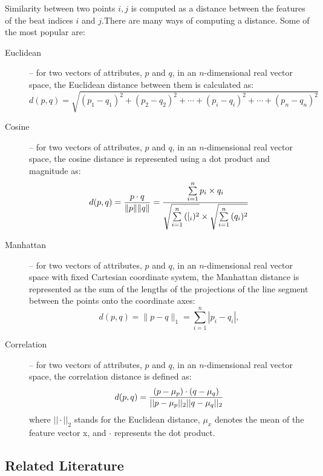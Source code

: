 Similarity between two points $i, j$ is computed as a distance between the features of the beat indices $i$ and $j$.There are many ways of computing a distance. Some of the most popular are:
\begin{description}
\item[Euclidean] --  for two vectors of attributes, $p$ and $q$, in an $n$-dimensional real vector space, the Euclidean distance between them is calculated as:
\begin{equation}
d(p, q) = \sqrt{(p_1- q_1)^2 + (p_2 - q_2)^2+\cdots+(p_i - q_i)^2+\cdots+(p_n - q_n)^2}
\end{equation}
\item[Cosine] --  for two vectors of attributes, $p$ and $q$, in an $n$-dimensional real vector space, the cosine distance is represented using a dot product and magnitude as:
\begin{equation}
d(p, q) = {p \cdot q \over \|p\| \|q\|} = \frac{ \sum\limits_{i=1}^{n}{p_i \times q_i} }{ \sqrt{\sum\limits_{i=1}^{n}{([_i)^2}} \times \sqrt{\sum\limits_{i=1}^{n}{(q_i)^2}} }
\end{equation}
\item[Manhattan] --  for two vectors of attributes, $p$ and $q$, in an $n$-dimensional real vector space with fixed Cartesian coordinate system, the Manhattan distance is represented as the sum of the lengths of the projections of the line segment between the points onto the coordinate axes:
\begin{equation}
d(p, q) = \|p - q\|_1 = \sum_{i=1}^n |p_i-q_i|,
\end{equation}
\item[Correlation] --  for two vectors of attributes, $p$ and $q$, in an $n$-dimensional real vector space, the correlation distance is defined as:
\begin{equation}
d(p, q) =  {(p - \mu _{p}) \cdot (q - \mu _{q}) \over ||p -\mu _{p} ||_{2} ||q - \mu _{q}||_{2}}
\end{equation}
where $|| \cdot ||_{2}$ stands for the Euclidean distance, $\mu _{x}$ denotes the mean of the feature vector x, and $\cdot$ represents the dot product.
\end{description}

\vspace{10pt}


\vspace{10pt}

\subsection{Related Literature}

